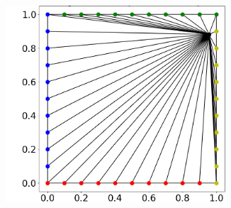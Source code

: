 \begin{figure}
  \quad
  \begin{subfigure}[t]{0.31\textwidth}%
    \centering%
    \includegraphics[width=0.9\textwidth, trim=37mm 14mm 6mm 6mm, clip]{images/fiber_creation/mesh_plots/out_2_1_0_tri.png}%
    \label{fig:w_21}%
  \end{subfigure}\\
  

\end{figure}
